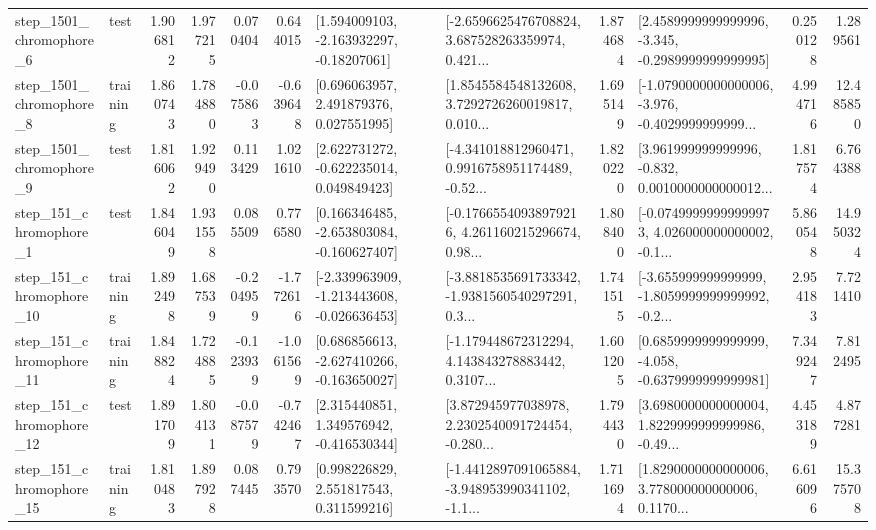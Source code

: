 \begin{tabular}{llrrrrllrlrr}
  step\_1501\_chromophore\_6 &      test &      1.906812 &    1.977215 &      0.070404 &  0.644015 &    [1.594009103, -2.163932297, -0.18207061] &  [-2.6596625476708824, 3.687528263359974, 0.421... &       1.874684 &  [2.4589999999999996, -3.345, -0.2989999999999995] &            0.250128 &          1.289561 \\
  step\_1501\_chromophore\_8 &  training &      1.860743 &    1.784880 &     -0.075863 & -0.639648 &     [0.696063957, 2.491879376, 0.027551995] &  [1.8545584548132608, 3.7292726260019817, 0.010... &       1.695149 &  [-1.0790000000000006, -3.976, -0.4029999999999... &            4.994716 &         12.485850 \\
  step\_1501\_chromophore\_9 &      test &      1.816062 &    1.929490 &      0.113429 &  1.021610 &    [2.622731272, -0.622235014, 0.049849423] &  [-4.341018812960471, 0.9916758951174489, -0.52... &       1.820220 &  [3.961999999999996, -0.832, 0.0010000000000012... &            1.817574 &          6.764388 \\
   step\_151\_chromophore\_1 &      test &      1.846049 &    1.931558 &      0.085509 &  0.776580 &   [0.166346485, -2.653803084, -0.160627407] &  [-0.17665540938979216, 4.261160215296674, 0.98... &       1.808400 &  [-0.07499999999999973, 4.026000000000002, -0.1... &            5.860548 &         14.950324 \\
  step\_151\_chromophore\_10 &  training &      1.892498 &    1.687539 &     -0.204959 & -1.772616 &  [-2.339963909, -1.213443608, -0.026636453] &  [-3.8818535691733342, -1.9381560540297291, 0.3... &       1.741515 &  [-3.655999999999999, -1.8059999999999992, -0.2... &            2.954183 &          7.721410 \\
  step\_151\_chromophore\_11 &  training &      1.848824 &    1.724885 &     -0.123939 & -1.061569 &   [0.686856613, -2.627410266, -0.163650027] &  [-1.179448672312294, 4.143843278883442, 0.3107... &       1.601205 &  [0.6859999999999999, -4.058, -0.6379999999999981] &            7.349247 &          7.812495 \\
  step\_151\_chromophore\_12 &      test &      1.891709 &    1.804131 &     -0.087579 & -0.742467 &    [2.315440851, 1.349576942, -0.416530344] &  [3.872945977038978, 2.2302540091724454, -0.280... &       1.794430 &  [3.6980000000000004, 1.8229999999999986, -0.49... &            4.453189 &          4.877281 \\
  step\_151\_chromophore\_15 &  training &      1.810483 &    1.897928 &      0.087445 &  0.793570 &     [0.998226829, 2.551817543, 0.311599216] &  [-1.4412897091065884, -3.948953990341102, -1.1... &       1.711694 &  [1.8290000000000006, 3.778000000000006, 0.1170... &            6.616096 &         15.375708 \\

\end{tabular}
